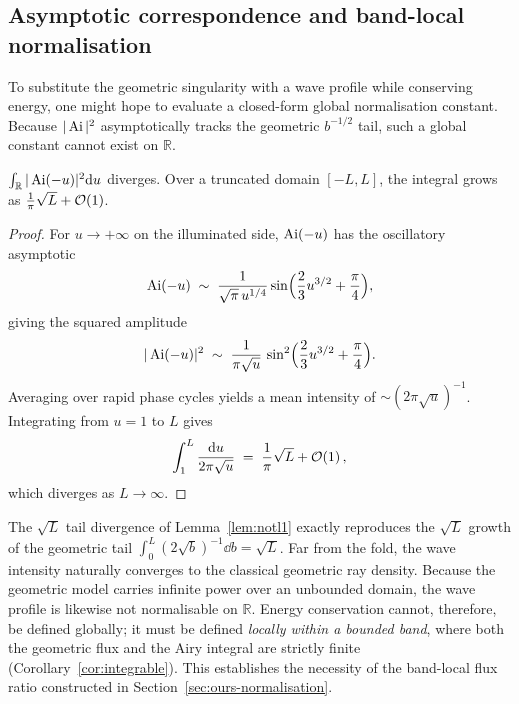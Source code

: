 \subsection{Asymptotic correspondence and band-local normalisation}
\label{sec:notintegrable}

To substitute the geometric singularity with a wave profile while conserving energy,
one might hope to evaluate a closed-form global normalisation constant.
Because $|\operatorname{Ai}|^2$ asymptotically tracks the geometric $b^{-1/2}$ tail,
such a global constant cannot exist on $\mathbb{R}$.

\begin{lemma}
\label{lem:notl1}
$\int_{\mathbb{R}} |\operatorname{Ai}(-u)|^2 \mathrm{d} u$ diverges. Over a truncated domain
$[-L,L]$, the integral grows as $\frac{1}{\pi}\sqrt{L} + \mathcal{O}\!\left(1\right)$.
\end{lemma}

\begin{proof}
For $u \to +\infty$ on the illuminated side, $\operatorname{Ai}(-u)$ has the
oscillatory asymptotic
\begin{equation}
\operatorname{Ai}(-u) \;\sim\; \frac{1}{\sqrt{\pi}\,u^{1/4}}
\sin\!\Big(\frac{2}{3}u^{3/2} + \frac{\pi}{4}\Big) ,
\end{equation}
giving the squared amplitude
\begin{equation}
|\operatorname{Ai}(-u)|^2 \;\sim\; \frac{1}{\pi\sqrt{u}}\,
\sin^2\!\Big(\frac{2}{3}u^{3/2} + \frac{\pi}{4}\Big) .
\end{equation}
Averaging over rapid phase cycles yields a mean intensity of
$\sim (2\pi\sqrt{u})^{-1}$. Integrating from $u = 1$ to $L$ gives
\begin{equation}
\int_{1}^{L} \frac{\mathrm{d} u}{2\pi\sqrt{u}} \;=\; \frac{1}{\pi}\sqrt{L} + \mathcal{O}\!\left(1\right) ,
\end{equation}
which diverges as $L \to \infty$.
\end{proof}

\begin{corollary}
\label{cor:norm}
The $\sqrt{L}$ tail divergence of Lemma~\ref{lem:notl1} exactly reproduces the
$\sqrt{L}$ growth of the geometric tail $\int_0^L (2\sqrt{b})^{-1}\dd b = \sqrt{L}$.
Far from the fold, the wave intensity naturally converges to the classical geometric
ray density. Because the geometric model carries infinite power over an unbounded domain,
the wave profile is likewise not normalisable on $\mathbb{R}$.
Energy conservation cannot, therefore, be defined globally; it must be defined
\emph{locally within a bounded band}, where both the geometric flux and the Airy
integral are strictly finite (Corollary~\ref{cor:integrable}).
This establishes the necessity of the band-local flux ratio constructed in
Section~\ref{sec:ours-normalisation}.
\end{corollary}

